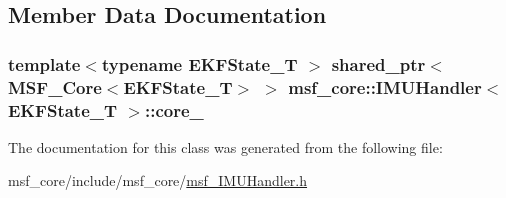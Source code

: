 \subsection{Member Data Documentation}
\hypertarget{classmsf__core_1_1IMUHandler_ae109422ae1b1ed7833bde860c71a9491}{
\subsubsection[{core\-\_\-}]{\setlength{\rightskip}{0pt plus 5cm}template$<$typename E\-K\-F\-State\-\_\-\-T $>$ shared\-\_\-ptr$<${\bf M\-S\-F\-\_\-\-Core}$<$E\-K\-F\-State\-\_\-\-T$>$ $>$ {\bf msf\-\_\-core\-::\-I\-M\-U\-Handler}$<$ E\-K\-F\-State\-\_\-\-T $>$\-::core\-\_\-\hspace{0.3cm}{\ttfamily [protected]}}}\label{classmsf__core_1_1IMUHandler_ae109422ae1b1ed7833bde860c71a9491}


The documentation for this class was generated from the following file\-:\begin{DoxyCompactItemize}
\item 
msf\-\_\-core/include/msf\-\_\-core/\hyperlink{msf__IMUHandler_8h}{msf\-\_\-\-I\-M\-U\-Handler.\-h}\end{DoxyCompactItemize}
